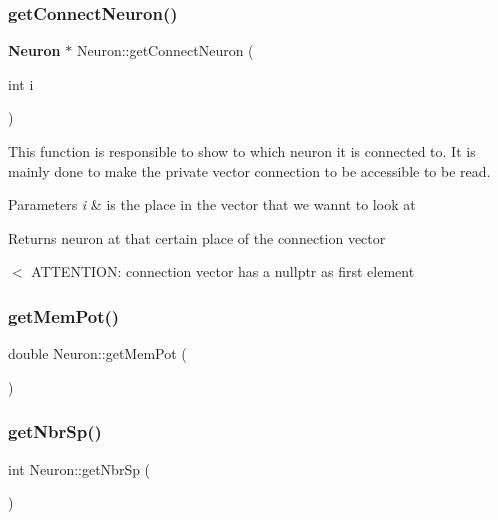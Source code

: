 \subsubsection{get\+Connect\+Neuron()}
{\footnotesize\ttfamily \textbf{ Neuron} $\ast$ Neuron\+::get\+Connect\+Neuron (\begin{DoxyParamCaption}\item[{int}]{i }\end{DoxyParamCaption})}

This function is responsible to show to which neuron it is connected to. It is mainly done to make the private vector connection to be accessible to be read. 
\begin{DoxyParams}{Parameters}
{\em i} & is the place in the vector that we wannt to look at \\
\hline
\end{DoxyParams}
\begin{DoxyReturn}{Returns}
neuron at that certain place of the connection vector 
\end{DoxyReturn}
$<$ A\+T\+T\+E\+N\+T\+I\+ON\+: connection vector has a nullptr as first element \mbox{\label{class_neuron_a8662cd2c161850aa1141ba0d9247e476}} 
\subsubsection{get\+Mem\+Pot()}
{\footnotesize\ttfamily double Neuron\+::get\+Mem\+Pot (\begin{DoxyParamCaption}{ }\end{DoxyParamCaption})\hspace{0.3cm}{\ttfamily [inline]}}

\mbox{\label{class_neuron_a2656be288ae861cf0b2b815adcfef622}} 
\subsubsection{get\+Nbr\+Sp()}
{\footnotesize\ttfamily int Neuron\+::get\+Nbr\+Sp (\begin{DoxyParamCaption}{ }\end{DoxyParamCaption})\hspace{0.3cm}{\ttfamily [inline]}}

\mbox{\label{class_neuron_a30899cfd423bf99b7faf944e77f6bc97}} 
